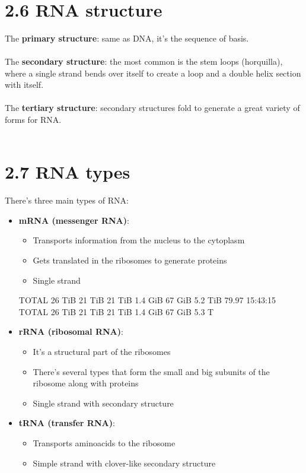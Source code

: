 \documentclass[a4paper,landscape,10pt]{cheatsheet}
\begin{document}
\hfil\\
\section*{2.6 RNA structure}
The \textbf{primary structure}: same as DNA, it's the sequence of basis.\\
\hfill\\
The \textbf{secondary structure}: the most common is the stem loops (horquilla), where a single strand bends over itself
to create a loop and a double helix section with itself.\\
\hfill\\
The \textbf{tertiary structure}: secondary structures fold to generate a great variety of forms for RNA.\\

\hfil\\
\section*{2.7 RNA types}
There's three main types of RNA:\\
\begin{itemize}
      \item \textbf{mRNA (messenger RNA)}:
            \begin{itemize}
                  \item Transports information from the nucleus to the cytoplasm
                  \item Gets translated in the ribosomes to generate proteins
                  \item Single strand \end{itemize}TOTAL   26 TiB   21 TiB   21 TiB  1.4 GiB   67 GiB  5.2 TiB  79.97 15:43:15
            TOTAL   26 TiB   21 TiB   21 TiB  1.4 GiB   67 GiB  5.3 T

      \item \textbf{rRNA (ribosomal RNA)}:
            \begin{itemize}
                  \item It's a structural part of the ribosomes
                  \item There's several types that form the small and big subunits of the ribosome along with proteins
                  \item Single strand with secondary structure
            \end{itemize}

      \item \textbf{tRNA (transfer RNA)}:
            \begin{itemize}
                  \item Transports aminoacids to the ribosome
                  \item Simple strand with clover-like secondary structure
            \end{itemize}
\end{itemize}
\end{document}

